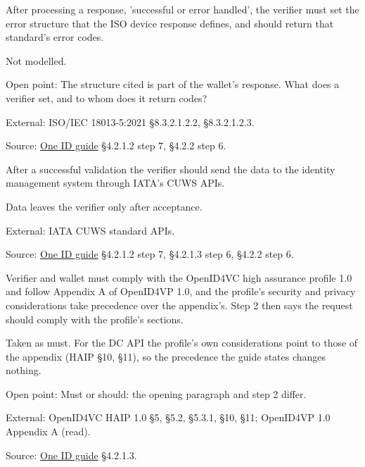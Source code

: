 \begin{definition}
  \label{def:c66}
  \notready
  After processing a response, 'successful or error handled', the verifier
  must set the error structure that the ISO device response defines, and
  should return that standard's error codes.

  Not modelled.

  Open point: The structure cited is part of the wallet's response. What does
  a verifier set, and to whom does it return codes?

  External: ISO/IEC 18013-5:2021 §8.3.2.1.2.2, §8.3.2.1.2.3.

  Source:
  \href{https://standards.atlassian.net/wiki/spaces/OneID/pages/2947416082/Technical+Implementation+Guide}{One
  ID guide} §4.2.1.2 step 7, §4.2.2 step 6.
\end{definition}

\begin{definition}
  \label{def:c67}
  After a successful validation the verifier should send the data to the
  identity management system through IATA's CUWS APIs.

  Data leaves the verifier only after acceptance.

  External: IATA CUWS standard APIs.

  Source:
  \href{https://standards.atlassian.net/wiki/spaces/OneID/pages/2947416082/Technical+Implementation+Guide}{One
  ID guide} §4.2.1.2 step 7, §4.2.1.3 step 6, §4.2.2 step 6.
\end{definition}

\begin{definition}
  \label{def:c68}
  \notready
  Verifier and wallet must comply with the OpenID4VC high assurance profile
  1.0 and follow Appendix A of OpenID4VP 1.0, and the profile's security and
  privacy considerations take precedence over the appendix's. Step 2 then
  says the request should comply with the profile's sections.

  Taken as must. For the DC API the profile's own considerations point to
  those of the appendix (HAIP §10, §11), so the precedence the guide states
  changes nothing.

  Open point: Must or should: the opening paragraph and step 2 differ.

  External: OpenID4VC HAIP 1.0 §5, §5.2, §5.3.1, §10, §11; OpenID4VP 1.0
  Appendix A (read).

  Source:
  \href{https://standards.atlassian.net/wiki/spaces/OneID/pages/2947416082/Technical+Implementation+Guide}{One
  ID guide} §4.2.1.3.
\end{definition}

